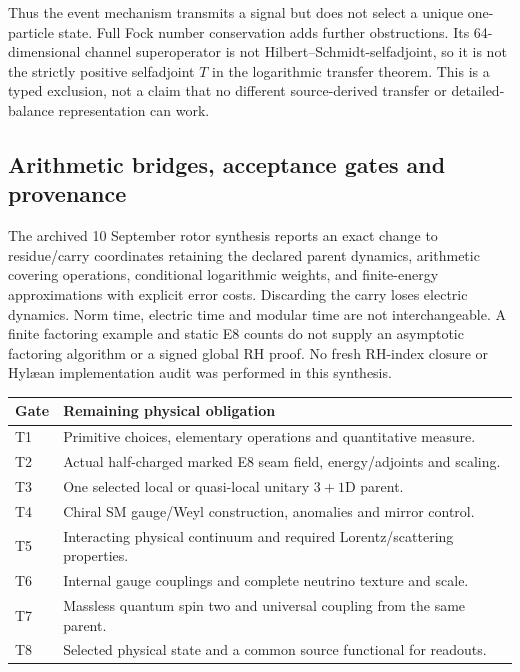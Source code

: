Thus the event mechanism transmits a signal but does not select a unique
one-particle state. Full Fock number conservation adds further obstructions.
Its 64-dimensional channel superoperator is not Hilbert--Schmidt-selfadjoint,
so it is not the strictly positive selfadjoint $T$ in the logarithmic
transfer theorem. This is a typed exclusion, not a claim that no different
source-derived transfer or detailed-balance representation can work.

\subsection{Arithmetic bridges, acceptance gates and provenance}

The archived 10 September rotor synthesis reports an exact change to
residue/carry coordinates retaining the declared parent dynamics, arithmetic
covering operations, conditional logarithmic weights, and finite-energy
approximations with explicit error costs. Discarding the carry loses
electric dynamics. Norm time, electric time and modular time are not
interchangeable. A finite factoring example and static E8 counts do not
supply an asymptotic factoring algorithm or a signed global RH proof.
No fresh RH-index closure or Hyl\ae an implementation audit was performed
in this synthesis.

\begin{center}
\small
\begin{tabularx}{\linewidth}{@{}lX@{}}
\toprule
Gate & Remaining physical obligation \\
\midrule
T1 & Primitive choices, elementary operations and quantitative measure.\\
T2 & Actual half-charged marked E8 seam field, energy/adjoints and scaling.\\
T3 & One selected local or quasi-local unitary $3+1$D parent.\\
T4 & Chiral SM gauge/Weyl construction, anomalies and mirror control.\\
T5 & Interacting physical continuum and required Lorentz/scattering properties.\\
T6 & Internal gauge couplings and complete neutrino texture and scale.\\
T7 & Massless quantum spin two and universal coupling from the same parent.\\
T8 & Selected physical state and a common source functional for readouts.\\
\bottomrule
\end{tabularx}
\end{center}

